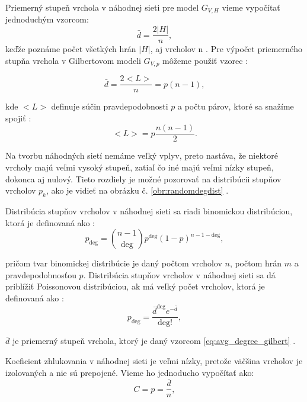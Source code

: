 Priemerný stupeň vrchola v náhodnej sieti pre model $G_{V,H}$ vieme vypočítať jednoduchým vzorcom:
\begin{equation}
    \bar{d} = \frac{2|H|}{n},
    \label{eq:avg_degree_random}
\end{equation}
keďže poznáme počet všetkých hrán $|H|$, aj vrcholov n \cite{barabasi2016network} . Pre výpočet priemerného stupňa vrchola
v Gilbertovom modeli $G_{V,p}$ môžeme použiť vzorec \cite{barabasi2016network} :

\begin{equation}
    \bar{d} = \frac{2<L>}{n} = p(n-1),
    \label{eq:avg_degree_gilbert}
\end{equation}

kde $<L>$ definuje súčin pravdepodobnosti $p$ a počtu párov, ktoré sa snažíme spojiť \cite{barabasi2016network} :
\begin{equation}
    <L> = p\frac{n(n-1)}{2}.
    \label{eq:avg_edges_gilbert}
\end{equation}

Na tvorbu náhodných sietí nemáme veľký vplyv, preto nastáva, že niektoré vrcholy majú veľmi vysoký stupeň, 
zatiaľ čo iné majú veľmi nízky stupeň, dokonca aj nulový. Tieto rozdiely je možné pozorovať na distribúcii
stupňov vrcholov $p_k$, ako je vidieť na obrázku č. \ref{obr:randomdegdist} \cite{barabasi2016network} .

Distribúcia stupňov vrcholov v náhodnej sieti sa riadi binomickou distribúciou, ktorá je definovaná ako \cite{barabasi2016network} :
\begin{equation}
    p_{\mathrm{deg}} = \binom{n-1}{\mathrm{deg}} p^{\mathrm{deg}} (1-p)^{n-1-\mathrm{deg}},
    \label{eq:binomial_distribution}        
\end{equation}

pričom tvar binomickej distribúcie je daný počtom vrcholov $n$, počtom hrán $m$ a pravdepodobnosťou $p$.
Distribúcia stupňov vrcholov v náhodnej sieti sa dá priblížiť Poissonovou distribúciou, ak má veľký počet vrcholov,
ktorá je definovaná ako \cite{barabasi2016network} :
\begin{equation}
    p_{\mathrm{deg}} = \frac{\bar{d}^{\mathrm{deg}} e^{-\bar{d}}}{\mathrm{deg}!},
    \label{eq:poisson_distribution}
\end{equation}

$\bar{d}$ je priemerný stupeň vrchola, ktorý je daný vzorcom \ref{eq:avg_degree_gilbert} .

Koeficient zhlukovania v náhodnej sieti je veľmi nízky, pretože väčšina vrcholov je izolovaných a nie sú prepojené.
Vieme ho jednoducho vypočítať ako:
\begin{equation}
    C = p = \frac{\bar{d}}{n},
    \label{eq:clustering_coefficient_random}
\end{equation}

